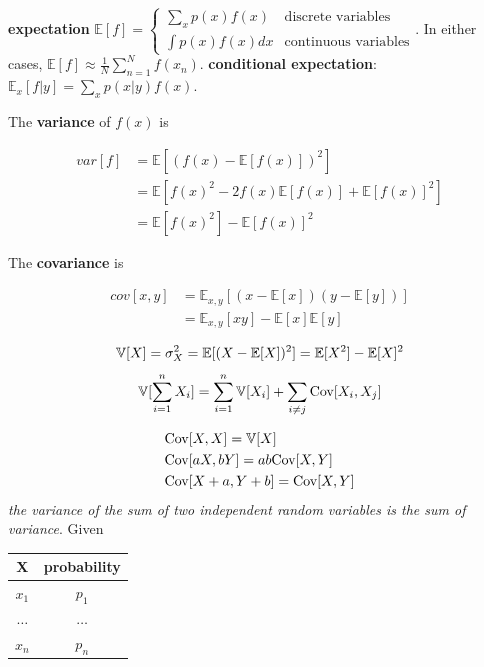 \documentclass[11pt]{article}
\begin{document}
\textbf{expectation} \(\mathbb{E}[f]=
   \begin{cases}
   \displaystyle\sum_{x}p(x)f(x) & \text{discrete variables}\\
   \int p(x)f(x)dx & \text{continuous variables}
   \end{cases}\). In either cases,
\(\mathbb{E}[f]\approx\frac{1}{N}\displaystyle\sum_{n=1}^N f(x_n)\).
\textbf{conditional expectation}: \(\mathbb{E}_x[f| y]=\displaystyle\sum_xp(x| y)f(x)\).

The \textbf{variance} of \(f(x)\) is

\begin{align*}
var[f]&=\mathbb{E}[(f(x)-\mathbb{E}[f(x)])^2]\\
&=\mathbb{E}[f(x)^2-2f(x)\mathbb{E}[f(x)]+\mathbb{E}[f(x)]^2]\\
&=\mathbb{E}[f(x)^2]-\mathbb{E}[f(x)]^2
\end{align*}


The \textbf{covariance} is

\begin{align*}
cov[x,y]&=\mathbb{E}_{x,y}[(x-\mathbb{E}[x])(y-\mathbb{E}[y])]\\
&=\mathbb{E}_{x,y}[xy]-\mathbb{E}[x]\mathbb{E}[y]
\end{align*}


\begin{equation*}
\mathbb{V}[X]=\sigma^2_X=\mathbb{E}[(X-\mathbb{E}[X])^2]=\mathbb{E}[X^2]-\mathbb{E}[X]^2
\end{equation*}
\begin{equation*}
\mathbb{V}[\displaystyle\sum_{i=1}^nX_i]=\displaystyle\sum_{i=1}^n\mathbb{V}[X_i]+
\displaystyle\sum_{i\neq j}\text{Cov}[X_i,X_j]
\end{equation*}

\begin{align*}
&\text{Cov}[X,X]=\mathbb{V}[X]\\
&\text{Cov}[aX,bY]=ab\text{Cov}[X,Y]\\
&\text{Cov}[X+a,Y+b]=\text{Cov}[X,Y]
\end{align*}
\emph{the variance of the sum of two independent random variables is the sum of}
\emph{variance}. Given
\begin{center}
\begin{tabular}{c|c}
X & probability\\
\hline
\(x_1\) & \(p_1\)\\
\(\dots\) & \(\dots\)\\
\(x_n\) & \(p_n\)\\
\end{tabular}
\end{center}
\end{document}
